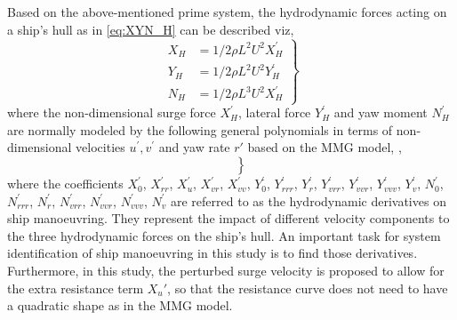 \noindent Based on the above-mentioned prime system, the hydrodynamic forces acting on a ship's hull as in \autoref{eq:XYN_H} can be described viz,
\begin{equation}
    \label{eq:XYN_H}
    \left.\begin{aligned}
    X_H & = 1/2\rho L^{2} U^{2} X_H^{'}  \\
    Y_H & = 1/2\rho L^{2} U^{2} Y_H^{'}  \\
    N_H & = 1/2\rho L^{3} U^{2} X_H^{'}
    \end{aligned}\right\}
\end{equation}
where the non-dimensional surge force $X_H^{'}$, lateral force $Y_H^{'}$ and yaw moment $N_H^{'}$ are normally modeled by the following general polynomials in terms of non-dimensional velocities $u^{'}, v^{'}$ and yaw rate $r'$ based on the MMG model, \citep{yasukawaIntroductionMMGStandard2015},
\begin{equation}
    \label{eq:XYN_H_prime}
    \left.\begin{aligned}
    &  \\
    &  \\
    & 
    \end{aligned}\right\}
\end{equation}
where the coefficients $X_0^{'}$, $X_{rr}^{'}$, $X_u^{'}$, $X_{vr}^{'}$, $X_{vv}^{'}$, $Y_{0}^{'}$, $Y_{rrr}^{'}$, $Y_{r}^{'}$, $Y_{vrr}^{'}$, $Y_{vvr}^{'}$, $Y_{vvv}^{'}$, $Y_{v}^{'}$, $N_{0}^{'}$, $N_{rrr}^{'}$, $N_{r}^{'}$, $N_{vrr}^{'}$, $N_{vvr}^{'}$, $N_{vvv}^{'}$, $N_{v}^{'}$ are referred to as the hydrodynamic derivatives on ship manoeuvring. They represent the impact of different velocity components to the three hydrodynamic forces on the ship's hull. An important task for system identification of ship manoeuvring in this study is to find those derivatives. Furthermore, in this study, the perturbed surge velocity is proposed to allow for the extra resistance term ${X_u}'$, so that the resistance curve does not need to have a quadratic shape as in the MMG model.  
%
%     
%     
